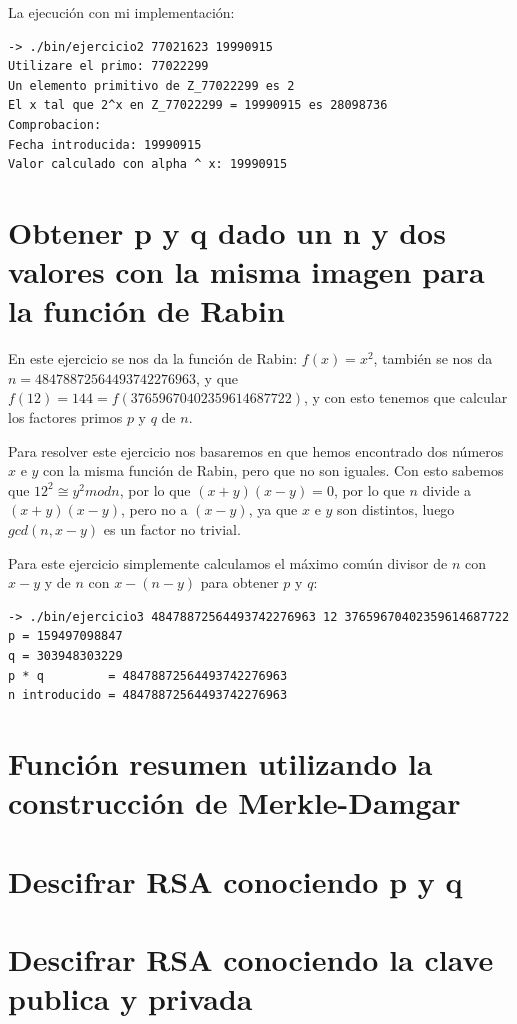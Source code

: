 \documentclass[12pt, spanish]{article}
\begin{document}
La ejecución con mi implementación:

\begin{lstlisting}
-> ./bin/ejercicio2 77021623 19990915
Utilizare el primo: 77022299
Un elemento primitivo de Z_77022299 es 2
El x tal que 2^x en Z_77022299 = 19990915 es 28098736
Comprobacion:
Fecha introducida: 19990915
Valor calculado con alpha ^ x: 19990915
\end{lstlisting}


\section{Obtener p y q dado un n y dos valores con la misma imagen para la función de Rabin}

En este ejercicio se nos da la función de Rabin: $f(x) = x^2$, también se nos da $n = 48478872564493742276963$, y que $f (12) =144 = f (37659670402359614687722)$, y con esto tenemos que calcular los factores primos $p$ y $q$ de $n$.

Para resolver este ejercicio nos basaremos en que hemos encontrado dos números $x$ e $y$ con la misma función de Rabin, pero que no son iguales. Con esto sabemos que $12^2 \cong y^2 mod n$, por lo que $(x + y)(x - y) = 0$, por lo que $n$ divide a $(x + y)(x - y)$, pero no a $(x - y)$, ya que $x$ e $y$ son distintos, luego $gcd(n, x - y)$ es un factor no trivial.

Para este ejercicio simplemente calculamos el máximo común divisor de $n$ con $x - y$ y de $n$ con $x - (n - y)$ para obtener $p$ y $q$:

\begin{lstlisting}
-> ./bin/ejercicio3 48478872564493742276963 12 37659670402359614687722
p = 159497098847
q = 303948303229
p * q         = 48478872564493742276963
n introducido = 48478872564493742276963
\end{lstlisting}


\section{Función resumen utilizando la construcción de Merkle-Damgar}

\section{Descifrar RSA conociendo p y q}

\section{Descifrar RSA conociendo la clave publica y privada}
\end{document}
